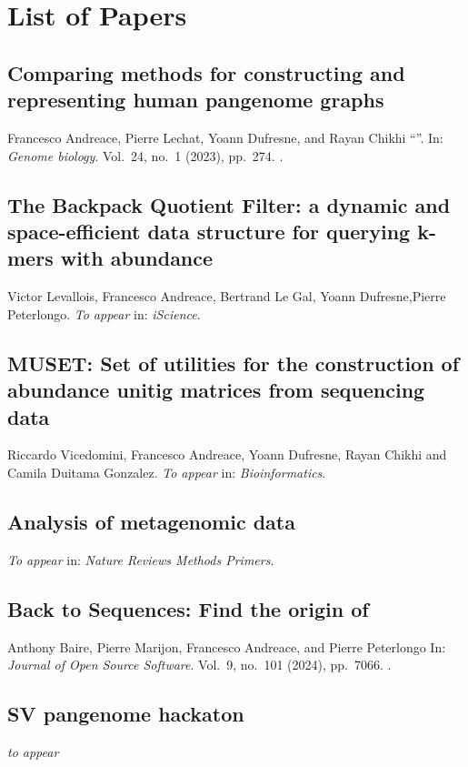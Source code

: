 \chapter{List of Papers}


\section*{Comparing methods for constructing and representing human pangenome graphs}
Francesco Andreace, Pierre Lechat, Yoann Dufresne, and Rayan Chikhi
\enquote{}.
In: \emph{Genome biology}.
Vol.\ 24,
no.\ 1
(2023),
pp.~274.
.

\section*{The Backpack Quotient Filter: a dynamic and space-efficient data structure for querying k-mers with abundance}
Victor Levallois, Francesco Andreace, Bertrand Le Gal, Yoann Dufresne,Pierre Peterlongo.
\emph{To appear} in: \emph{iScience}.



\section*{MUSET: Set of utilities for the construction of abundance unitig matrices from sequencing data}
Riccardo Vicedomini, Francesco Andreace, Yoann Dufresne, Rayan Chikhi and Camila Duitama Gonzalez.
\emph{To appear} in: \emph{Bioinformatics}.

\section*{Analysis of metagenomic data}
\emph{To appear} in: \emph{Nature Reviews Methods Primers}.


\section*{Back to Sequences: Find the origin of \kmers}
Anthony Baire, Pierre Marijon, Francesco Andreace, and Pierre
Peterlongo 
In: \emph{Journal of Open Source Software}.
Vol.\ 9,
no.\ 101
(2024),
pp.~7066.
.



\section*{SV pangenome hackaton}
\emph{to appear}